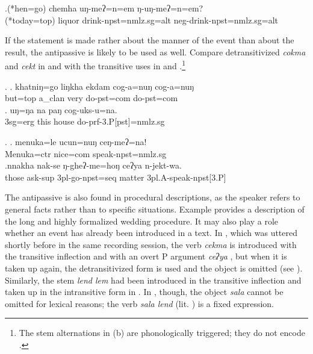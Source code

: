 	\exg.\label{ex-raksi}(*hen=go) chemha uŋ-meʔ=n=em ŋ-uŋ-meʔ=n=em?\\
(*today{\sc =top}) liquor  drink{\sc [3sg]-npst=nmlz.sg=alt} {\sc neg-}drink{\sc [3sg]-npst=nmlz.sg=alt}\\

If the statement is made rather about the manner of the event than about the result, the antipassive is likely to be used as well. Compare detransitivized \emph{cokma}  and \emph{cekt}  in \Next[a] and  \NNext[a] with the transitive uses in  \Next[b] and \NNext[b].\footnote{The stem alternations in (b) are phonologically triggered; they do not encode .}

\ex. \ag. khatniŋ=go liŋkha ekdam cog-a=nuŋ cog-a=nuŋ\\
but{\sc =top} a\_clan  very do{\sc [3sg]-pst=com} do{\sc [3sg]-pst=com}\\
 
\bg. uŋ=ŋa na paŋ cog-uks-u=na.\\
   {\sc 3sg=erg} this house   do{\sc -prf-3.P[pst]=nmlz.sg}\\

\ex. \ag. menuka=le ucun=nuŋ ceŋ-meʔ=na!\\
Menuka{\sc =ctr} nice{\sc =com} speak{\sc [3sg]-npst=nmlz.sg}\\
\bg.nnakha nak-se            ŋ-gheʔ-me=hoŋ          ceʔya n-jekt-wa.\\
		those ask{\sc -sup} {\sc 3pl-}go{\sc -npst=seq}	matter	{\sc 3pl.A-}speak{\sc -npst[3.P]}\\
	 


The antipassive is also found in procedural descriptions, as the speaker refers to general facts rather than to specific situations. Example \Next[a] provides  a description of the long and highly formalized wedding procedure. It may also play a role whether an event has  already been introduced in a text. In \Last[b], which was uttered shortly before \Next[a] in the same recording session, the verb \emph{cekma}  is introduced with the transitive inflection and with an overt P argument \emph{ceʔya} , but when it is taken up again, the detransitivized form is used and the object is omitted (see \Next[a]). Similarly, the stem \emph{lend \ti lem}  had been introduced in the transitive inflection and taken up in the intransitive form in  \Next[a]. In \Next[b], though, the object  \emph{sala} cannot be omitted for lexical reasons; the verb \emph{sala lend}  (lit. ) is a  fixed expression.
\largerpage

